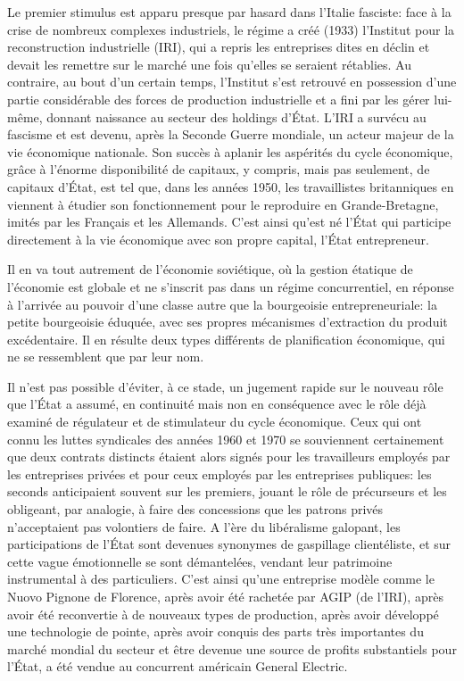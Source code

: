 Le premier stimulus est apparu presque par hasard dans l'Italie fasciste: face à la crise de nombreux complexes industriels, le régime a créé (1933) l'Institut pour la reconstruction industrielle (IRI), qui a repris les entreprises dites en déclin et devait les remettre sur le marché une fois qu'elles se seraient rétablies. Au contraire, au bout d'un certain temps, l'Institut s'est retrouvé en possession d'une partie considérable des forces de production industrielle et a fini par les gérer lui-même, donnant naissance au secteur des holdings d'État. L'IRI a survécu au fascisme et est devenu, après la Seconde Guerre mondiale, un acteur majeur de la vie économique nationale. Son succès à aplanir les aspérités du cycle économique, grâce à l'énorme disponibilité de capitaux, y compris, mais pas seulement, de capitaux d'État, est tel que, dans les années 1950, les travaillistes britanniques en viennent à étudier son fonctionnement pour le reproduire en Grande-Bretagne, imités par les Français et les Allemands. C'est ainsi qu'est né l'État qui participe directement à la vie économique avec son propre capital, l'État entrepreneur.

Il en va tout autrement de l'économie soviétique, où la gestion étatique de l'économie est globale et ne s'inscrit pas dans un régime concurrentiel, en réponse à l'arrivée au pouvoir d'une classe autre que la bourgeoisie entrepreneuriale: la petite bourgeoisie éduquée, avec ses propres mécanismes d'extraction du produit excédentaire. Il en résulte deux types différents de planification économique, qui ne se ressemblent que par leur nom.

Il n'est pas possible d'éviter, à ce stade, un jugement rapide sur le nouveau rôle que l'État a assumé, en continuité mais non en conséquence avec le rôle déjà examiné de régulateur et de stimulateur du cycle économique. Ceux qui ont connu les luttes syndicales des années 1960 et 1970 se souviennent certainement que deux contrats distincts étaient alors signés pour les travailleurs employés par les entreprises privées et pour ceux employés par les entreprises publiques: les seconds anticipaient souvent sur les premiers, jouant le rôle de précurseurs et les obligeant, par analogie, à faire des concessions que les patrons privés n'acceptaient pas volontiers de faire. A l'ère du libéralisme galopant, les participations de l'État sont devenues synonymes de gaspillage clientéliste, et sur cette vague émotionnelle se sont démantelées, vendant leur patrimoine instrumental à des particuliers. C'est ainsi qu'une entreprise modèle comme le Nuovo Pignone de Florence, après avoir été rachetée par AGIP (de l'IRI), après avoir été reconvertie à de nouveaux types de production, après avoir développé une technologie de pointe, après avoir conquis des parts très importantes du marché mondial du secteur et être devenue une source de profits substantiels pour l'État, a été vendue au concurrent américain General Electric.

